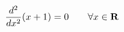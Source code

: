 \documentclass[preview]{standalone}
\begin{document}
\begin{align*}
\special{dvisvgm:raw <g id='unique000'>}\frac{d^2}{dx^2}(x + 1) = 0 \qquad \forall x \in \mathbf{R}\special{dvisvgm:raw </g>}
\end{align*}
\end{document}
